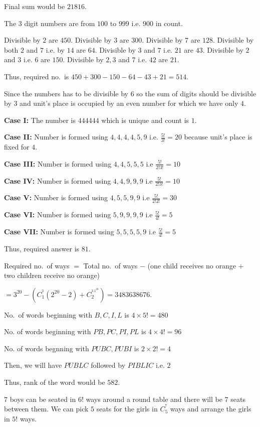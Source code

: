   Final sum would be $21816$.
\item The $3$ digit numbers are from $100$ to $999$ i.e. $900$ in count.

  Divisible by $2$ are $450$. Divisible by $3$ are $300$. Divisible by $7$ are $128$. Divisible by both $2$
  and $7$ i.e. by $14$ are $64$. Divisible by $3$ and $7$ i.e. $21$ are $43$. Divisible by $2$ and $3$
  i.e. $6$ are $150$. Divisible by $2, 3$ and $7$ i.e. $42$ are $21$.

  Thus, required no.\ is $450 + 300 - 150 - 64 - 43 + 21 = 514$.
\item Since the numbers has to be divisible by $6$ so the sum of digits should be divisible by $3$ and
  unit's place is occupied by an even number for which we have only $4$.

  {\bf Case I:} The number is $444444$ which is unique and count is $1$.

  {\bf Case II:} Number is formed using $4, 4, 4, 4, 5, 9$ i.e. $\frac{5!}{3!} = 20$ because unit's place is
  fixed for $4$.

  {\bf Case III:} Number is formed using $4, 4, 5, 5, 5$ i.e $\frac{5!}{2!3!} = 10$

  {\bf Case IV:} Number is formed using $4, 4, 9, 9, 9$ i.e $\frac{5!}{2!3!} = 10$

  {\bf Case V:} Number is formed using $4, 5, 5, 9, 9$ i.e $\frac{5!}{2!2!} = 30$

  {\bf Case VI:} Number is formed using $5, 9, 9, 9, 9$ i.e $\frac{5!}{4!} = 5$

  {\bf Case VII:} Number is formed using $5, 5, 5, 5, 9$ i.e $\frac{5!}{4!} = 5$

  Thus, required answer is $81$.
\item Required no.\ of ways $=$ Total no.\ of ways $-$ (one child receives no orange $+$ two children
  receive no orange)

  $= 3^{20} - \left(C_1^^3(2^{20} - 2) + C_2^^3.1^{20}\right) = 3483638676$.
\item No.\ of words beginning with $B, C, I, L$ is $4\times5! = 480$

  No. of words beginning with $PB, PC, PI, PL$ is $4\times 4! = 96$

  No. of words begnning with $PUBC, PUBI$ is $2\times2! = 4$

  Then, we will have $PUBLC$ followed by $PIBLIC$ i.e. $2$

  Thus, rank of the word  would be $582$.
\item $7$ boys can be seated in $6!$ ways around a round table and there will be $7$ seats between them. We
  can pick $5$ seats for the girls in $C_5^^7$ ways and arrange the girls in $5!$ ways.

